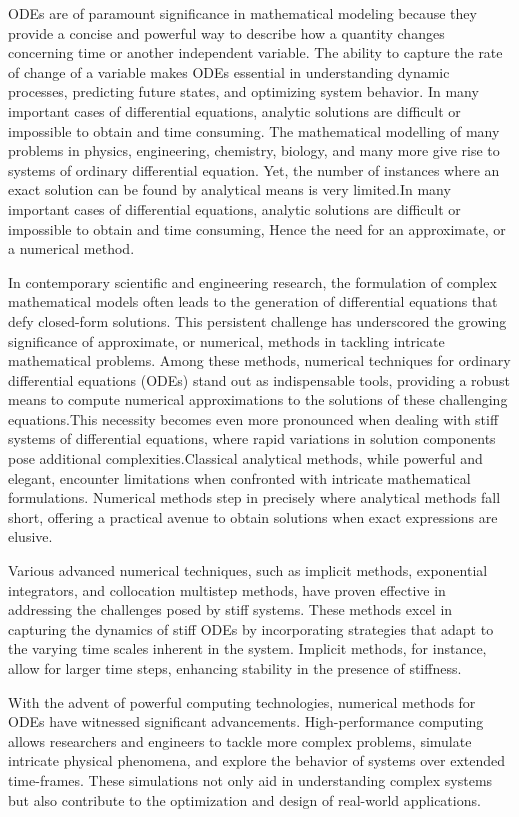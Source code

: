 \documentclass[a4paper, twoside]{report} %
\begin{document}
	ODEs are of paramount significance in mathematical modeling because they provide a concise and powerful way to describe how a quantity changes concerning time or another independent variable. The ability to capture the rate of change of a variable makes ODEs essential in understanding dynamic processes, predicting future states, and optimizing system behavior.
	In many important cases of differential equations, analytic solutions are difficult or impossible to obtain and time
	consuming.
	The mathematical modelling of many problems in physics, engineering, chemistry, biology, and many more give rise to systems of ordinary differential equation. Yet, the number of instances where an exact solution can be found by analytical means is very limited\cite{lambert1977}.In many important cases of differential equations, analytic solutions are difficult or impossible to obtain and time
	consuming, Hence the need for an approximate, or a numerical method.

	In contemporary scientific and engineering research, the formulation of complex mathematical models often leads to the generation of differential equations that defy closed-form solutions. This persistent challenge has underscored the growing significance of approximate, or numerical, methods in tackling intricate mathematical problems. Among these methods, numerical techniques for ordinary differential equations (ODEs) stand out as indispensable tools, providing a robust means to compute numerical approximations to the solutions of these challenging equations.This necessity becomes even more pronounced when dealing with stiff systems of differential equations, where rapid variations in solution components pose additional complexities.Classical analytical methods, while powerful and elegant, encounter limitations when confronted with intricate mathematical formulations. Numerical methods step in precisely where analytical methods fall short, offering a practical avenue to obtain solutions when exact expressions are elusive.

	Various advanced numerical techniques, such as implicit methods, exponential integrators, and collocation multistep methods, have proven effective in addressing the challenges posed by stiff systems. These methods excel in capturing the dynamics of stiff ODEs by incorporating strategies that adapt to the varying time scales inherent in the system. Implicit methods, for instance, allow for larger time steps, enhancing stability in the presence of stiffness.

	With the advent of powerful computing technologies, numerical methods for ODEs have witnessed significant advancements. High-performance computing allows researchers and engineers to tackle more complex problems, simulate intricate physical phenomena, and explore the behavior of systems over extended time-frames. These simulations not only aid in understanding complex systems but also contribute to the optimization and design of real-world applications.
\end{document}
